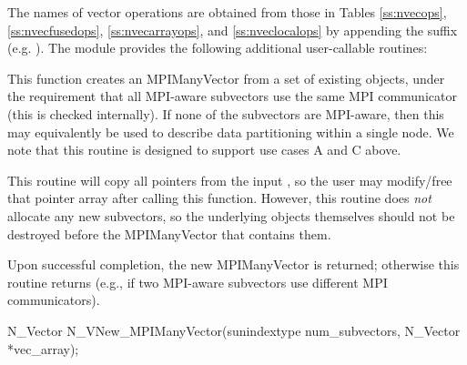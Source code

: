 The names of vector operations are obtained from those in Tables
\ref{ss:nvecops}, \ref{ss:nvecfusedops}, \ref{ss:nvecarrayops}, and
\ref{ss:nveclocalops} by appending the suffix  
(e.g. ).
The module {\nvecmpimanyvector} provides the following additional
user-callable routines:
{
  This function creates an MPIManyVector from a set of existing {\nvector}
  objects, under the requirement that all MPI-aware subvectors use the
  same MPI communicator (this is checked internally).  If none of the
  subvectors are MPI-aware, then this may equivalently be used to
  describe data partitioning within a single node.  We note that this
  routine is designed to support use cases A and C above.

  This routine will copy all  pointers from the input
  , so the user may modify/free that pointer array
  after calling this function.  However, this routine does \emph{not}
  allocate any new subvectors, so the underlying {\nvector} objects
  themselves should not be destroyed before the MPIManyVector that
  contains them.

  Upon successful completion, the new MPIManyVector is returned;
  otherwise this routine returns  (e.g., if two MPI-aware
  subvectors use different MPI communicators).
}
{
  N\_Vector N\_VNew\_MPIManyVector(sunindextype num\_subvectors,
  N\_Vector *vec\_array);
}
